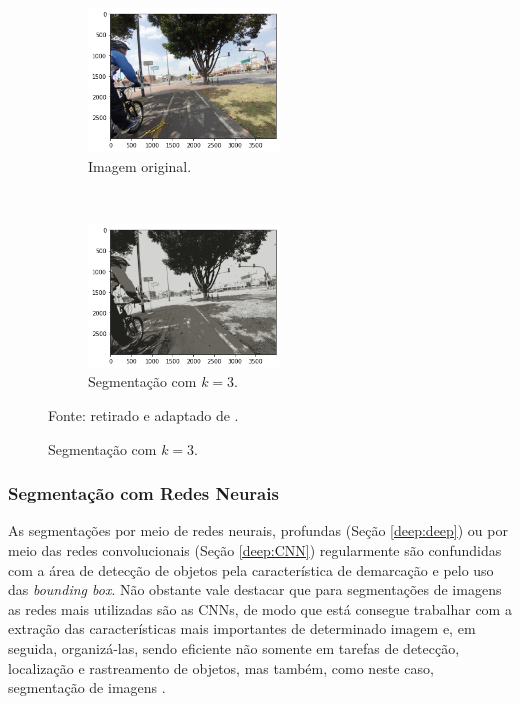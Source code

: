 \begin{figure}[H]
   \caption{Segmentação com K-means.}
   \centering
   \label{segment:fig:5}
    \begin{subfigure}[t]{0.45\textwidth}
        \centering
        \includegraphics[height=1.5in]{recursos/imagens/image_seg/i1.png}
        \caption{Imagem original.}
        \label{segment:fig:5.1}
    \end{subfigure}%
    ~ 
    \begin{subfigure}[t]{0.45\textwidth}
        \centering
        \includegraphics[height=1.5in]{recursos/imagens/image_seg/i2.png}
        \caption{Segmentação com $k = 3$.}
        \label{segment:fig:5.2}
    \end{subfigure}%

    \vspace*{1 cm}
    Fonte: retirado e adaptado de \cite{Neuhold2017_ICCV}.
\end{figure}

\subsubsection{Segmentação com Redes Neurais}
\label{segment:neural}

As segmentações por meio de redes neurais, profundas (Seção \ref{deep:deep}) ou por meio das redes convolucionais (Seção \ref{deep:CNN}) regularmente são confundidas com a área de detecção de objetos \cite{Ghosh2019} pela característica de demarcação e pelo uso das \textit{bounding box}. Não obstante vale destacar que para segmentações de imagens as redes mais utilizadas são as CNNs, de modo que está consegue trabalhar com a extração das características mais importantes de determinado imagem e, em seguida, organizá-las, sendo eficiente não somente em tarefas de detecção, localização e rastreamento de objetos, mas também, como neste caso, segmentação de imagens \cite{Ghosh2019}.

